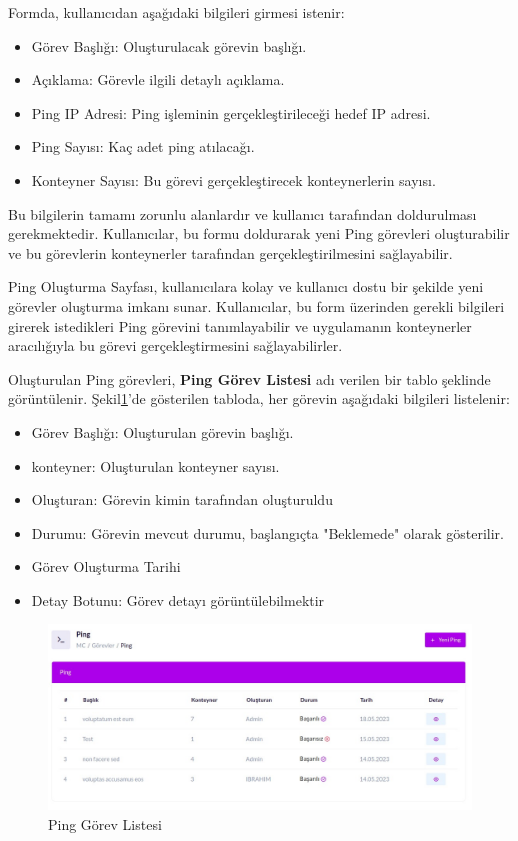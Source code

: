 Formda, kullanıcıdan aşağıdaki bilgileri girmesi istenir:
\begin{itemize}
  \item Görev Başlığı: Oluşturulacak görevin başlığı.
  \item Açıklama: Görevle ilgili detaylı açıklama.
  \item Ping IP Adresi: Ping işleminin gerçekleştirileceği hedef IP adresi.
  \item Ping Sayısı: Kaç adet ping atılacağı.
  \item Konteyner Sayısı: Bu görevi gerçekleştirecek konteynerlerin sayısı.
\end{itemize}

Bu bilgilerin tamamı zorunlu alanlardır ve kullanıcı tarafından doldurulması gerekmektedir. Kullanıcılar, bu formu doldurarak yeni Ping görevleri oluşturabilir ve bu görevlerin konteynerler tarafından gerçekleştirilmesini sağlayabilir.

Ping Oluşturma Sayfası, kullanıcılara kolay ve kullanıcı dostu bir şekilde yeni görevler oluşturma imkanı sunar. Kullanıcılar, bu form üzerinden gerekli bilgileri girerek istedikleri Ping görevini tanımlayabilir ve uygulamanın konteynerler aracılığıyla bu görevi gerçekleştirmesini sağlayabilirler.

Oluşturulan Ping görevleri, \textbf{Ping Görev Listesi} adı verilen bir tablo şeklinde görüntülenir. Şekil\ref{fig:ping_list}'de gösterilen tabloda, her görevin aşağıdaki bilgileri listelenir:

\begin{itemize}
  \item Görev Başlığı: Oluşturulan görevin başlığı.
  \item konteyner: Oluşturulan konteyner sayısı.
  \item Oluşturan: Görevin kimin tarafından oluşturuldu
  \item Durumu: Görevin mevcut durumu, başlangıçta "Beklemede" olarak gösterilir.
  \item Görev Oluşturma Tarihi
  \item Detay Botunu: Görev detayı görüntülebilmektir
\end{itemize}

\begin{figure}[ht]
  \centering
  \includegraphics[width=0.6\linewidth]{images/ping_list.jpeg}
  \caption{Ping Görev Listesi}
  \label{fig:ping_list}
\end{figure}


